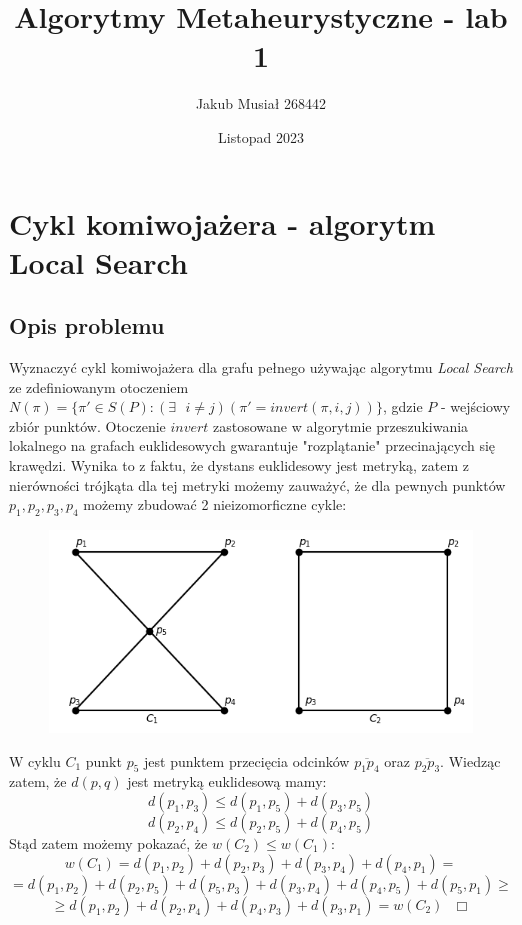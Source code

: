 \documentclass[12pt]{article}
\title{Algorytmy Metaheurystyczne - lab 1}
\author{Jakub Musiał 268442}
\date{Listopad 2023}
\begin{document}
\maketitle

\section*{Cykl komiwojażera - algorytm Local Search}

\subsection*{Opis problemu}
    Wyznaczyć cykl komiwojażera dla grafu pełnego używając algorytmu \textit{Local Search} ze zdefiniowanym
    otoczeniem $N(\pi) = \{\pi' \in S(P) : (\exists \text{ } i \ne j)(\pi' = invert(\pi, i, j))\}$,
    gdzie $P$ - wejściowy zbiór punktów.
    \newline
    Otoczenie $invert$ zastosowane w algorytmie przeszukiwania lokalnego na grafach euklidesowych
    gwarantuje "rozplątanie" przecinających się krawędzi. Wynika to z faktu, że dystans euklidesowy
    jest metryką, zatem z nierówności trójkąta dla tej metryki możemy zauważyć, że dla pewnych punktów
    $p_1, p_2, p_3, p_4$ możemy zbudować 2 nieizomorficzne cykle:
    \begin{figure}[h]
        \centering
        \includegraphics[scale=0.6]{img/euclidean_cycles.png}
        \label{fig:euclidean_cycles}
    \end{figure}
    \newline
    W cyklu $C_1$ punkt $p_5$ jest punktem przecięcia odcinków $\overline{p_1p_4}$ oraz $\overline{p_2p_3}$.
    Wiedząc zatem, że $d(p, q)$ jest metryką euklidesową mamy:
    $$ d(p_1,p_3) \leq d(p_1,p_5) + d(p_3,p_5) $$
    $$ d(p_2,p_4) \leq d(p_2,p_5) + d(p_4,p_5) $$
    Stąd zatem możemy pokazać, że $w(C_2) \leq w(C_1)$:
    $$w(C_1) = d(p_1,p_2) + d(p_2,p_3) + d(p_3,p_4) + d(p_4,p_1) =$$
    $$= d(p_1,p_2) + d(p_2,p_5) + d(p_5,p_3) + d(p_3,p_4) + d(p_4,p_5) + d(p_5,p_1) \geq$$
    $$\geq d(p_1,p_2) + d(p_2,p_4) + d(p_4,p_3) + d(p_3,p_1) = w(C_2) \text{   } \Box$$
\end{document}

